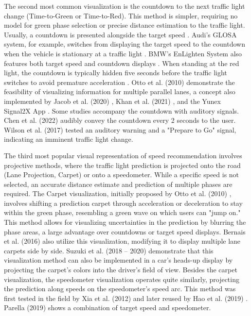 The second most common visualization is the countdown to the next traffic light change (Time-to-Green or Time-to-Red). This method is simpler, requiring no model for green phase selection or precise distance estimation to the traffic light. Usually, a countdown is presented alongside the target speed \cite{koukoumidis_signalguru_2011, koukoumidis_leveraging_2012}. Audi's GLOSA system, for example, switches from displaying the target speed to the countdown when the vehicle is stationary at a traffic light \cite{zweck_traffic_2013}. BMW's EnLighten System also features both target speed and countdown displays \cite{sokolov_effects_2018}. When standing at the red light, the countdown is typically hidden five seconds before the traffic light switches to avoid premature acceleration \cite{stahlmann_exploring_2018, sokolov_effects_2018}. Otto et al. (2010) \cite{otto_operating_2010} demonstrate the feasibility of visualizing information for multiple parallel lanes, a concept also implemented by Jacob et al. (2020) \cite{jacob_ivs-kom_2020}, Khan et al. (2021) \cite{khan_eco-drive_2021}, and the Yunex Signal2X App \cite{yunex_traffic_v2x-kommunikation_2023}. Some studies accompany the countdown with auditory signals. Chen et al. (2022) \cite{chen_developing_2022} audibly convey the countdown every 2 seconds to the user. Wilson et al. (2017) \cite{wilson_driver_2017} tested an auditory warning and a "Prepare to Go" signal, indicating an imminent traffic light change.

The third most popular visual representation of speed recommendation involves projective methods, where the traffic light prediction is projected onto the road (Lane Projection, Carpet) or onto a speedometer. While a specific speed is not selected, an accurate distance estimate and prediction of multiple phases are required. The Carpet visualization, initially proposed by Otto et al. (2010) \cite{otto_operating_2010}, involves shifting a prediction carpet through acceleration or deceleration to stay within the green phase, resembling a green wave on which users can "jump on." This method allows for visualizing uncertainties in the prediction by blurring the phase areas, a large advantage over countdowns or target speed displays. Bernais et al. (2016) \cite{bernais_design_2016} also utilize this visualization, modifying it to display multiple lane carpets side by side. Suzuki et al. (2018 -- 2020) \cite{suzuki_new_2018, suzuki_safety_2020} demonstrate that this visualization method can also be implemented in a car's heads-up display by projecting the carpet's colors into the driver's field of view. Besides the carpet visualization, the speedometer visualization operates quite similarly, projecting the prediction along speeds on the speedometer's speed arc. This method was first tested in the field by Xia et al. (2012) \cite{xia_field_2012} and later reused by Hao et al. (2019) \cite{hao_eco-approach_2019}. Parella (2019) \cite{marias_parella_design_2019} shows a combination of target speed and speedometer.


